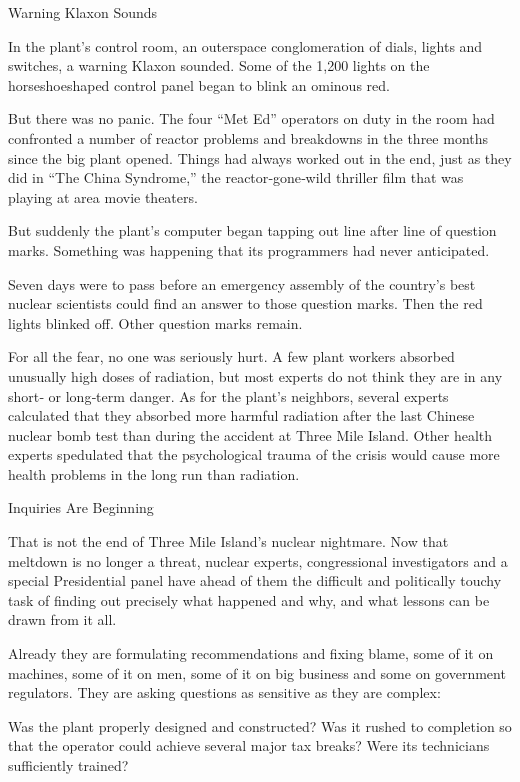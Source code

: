 Warning Klaxon Sounds

In the plant's control room, an outerspace conglomeration of dials,
lights and switches, a warning Klaxon sounded. Some of the 1,200 lights
on the horseshoeshaped control panel began to blink an ominous red.

But there was no panic. The four ``Met Ed'' operators on duty in the
room had confronted a number of reactor problems and breakdowns in the
three months since the big plant opened. Things had always worked out in
the end, just as they did in ``The China Syndrome,'' the
reactor‐gone‐wild thriller film that was playing at area movie theaters.

But suddenly the plant's computer began tapping out line after line of
question marks. Something was happening that its programmers had never
anticipated.

Seven days were to pass before an emergency assembly of the country's
best nuclear scientists could find an answer to those question marks.
Then the red lights blinked off. Other question marks remain.

For all the fear, no one was seriously hurt. A few plant workers
absorbed unusually high doses of radiation, but most experts do not
think they are in any short‐ or long‐term danger. As for the plant's
neighbors, several experts calculated that they absorbed more harmful
radiation after the last Chinese nuclear bomb test than during the
accident at Three Mile Island. Other health experts spedulated that the
psychological trauma of the crisis would cause more health problems in
the long run than radiation.

Inquiries Are Beginning

That is not the end of Three Mile Island's nuclear nightmare. Now that
meltdown is no longer a threat, nuclear experts, congressional
investigators and a special Presidential panel have ahead of them the
difficult and politically touchy task of finding out precisely what
happened and why, and what lessons can be drawn from it all.

Already they are formulating recommendations and fixing blame, some of
it on machines, some of it on men, some of it on big business and some
on government regulators. They are asking questions as sensitive as they
are complex:

Was the plant properly designed and constructed? Was it rushed to
completion so that the operator could achieve several major tax breaks?
Were its technicians sufficiently trained?

